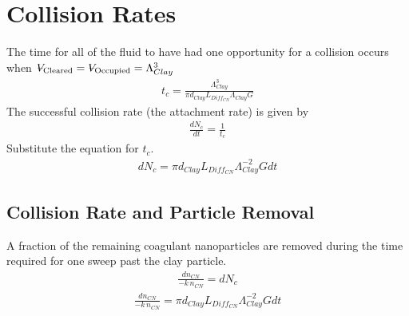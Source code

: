 \documentclass[letterpaper,10pt,english]{sphinxmanual}
\begin{document}
\section{Collision Rates}
\label{\detokenize{Rapid_Mix/RM_Theory_and_Future_Work:collision-rates}}\label{\detokenize{Rapid_Mix/RM_Theory_and_Future_Work:heading-collision-rates}}
The time for all of the fluid to have had one opportunity for a collision occurs when \({\rlap{\kern.08em--}V_{\rm{Cleared}}} = {\rlap{\kern.08em--}V_{\rm{Occupied}}} = \Lambda_{Clay}^3\)
\begin{equation}\label{equation:Rapid_Mix/RM_Theory_and_Future_Work:Rapid_Mix/RM_Theory_and_Future_Work:9}
\begin{split}t_c = \frac{\Lambda_{Clay}^3}{\pi d_{Clay} L_{Diff_{CN}} \Lambda_{Clay} G}\end{split}
\end{equation}
The successful collision rate (the attachment rate) is given by
\begin{equation}\label{equation:Rapid_Mix/RM_Theory_and_Future_Work:Rapid_Mix/RM_Theory_and_Future_Work:10}
\begin{split}\frac{dN_c}{dt} = \frac{1}{t_c}\end{split}
\end{equation}
Substitute the equation for \(t_c\).
\begin{equation}\label{equation:Rapid_Mix/RM_Theory_and_Future_Work:Rapid_Mix/RM_Theory_and_Future_Work:11}
\begin{split}dN_c = \pi d_{Clay} L_{Diff_{CN}}{\Lambda^{-2}_{Clay}} G dt\end{split}
\end{equation}

\subsection{Collision Rate and Particle Removal}
\label{\detokenize{Rapid_Mix/RM_Theory_and_Future_Work:collision-rate-and-particle-removal}}\label{\detokenize{Rapid_Mix/RM_Theory_and_Future_Work:heading-collision-rate-and-particle-removal}}
A fraction of the remaining coagulant nanoparticles are removed during the time required for one sweep past the clay particle.
\begin{equation}\label{equation:Rapid_Mix/RM_Theory_and_Future_Work:Rapid_Mix/RM_Theory_and_Future_Work:12}
\begin{split}\frac{dn_{CN}}{ - k \, n_{CN}} = dN_c\end{split}
\end{equation}\begin{equation}\label{equation:Rapid_Mix/RM_Theory_and_Future_Work:Rapid_Mix/RM_Theory_and_Future_Work:13}
\begin{split}\frac{dn_{CN}}{ - k \, n_{CN}} = \pi d_{Clay} L_{Diff_{CN}}{\Lambda^{-2}_{Clay}} G dt\end{split}
\end{equation}
\end{document}
